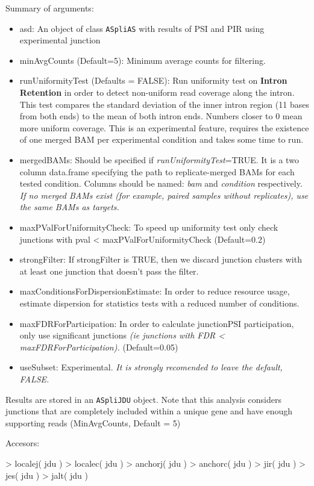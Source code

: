 \documentclass{article}
\begin{document}
Summary of arguments:
\begin{itemize}
\item asd: An object of class \texttt{ASpliAS} with results of PSI and PIR using experimental junction
\item minAvgCounts (Default=5): Minimum average counts for filtering. 
\item runUniformityTest  (Defaults =   FALSE): Run uniformity test on \textbf{Intron Retention} in order to detect non-uniform read coverage along the intron. This test compares the standard deviation of the inner intron region (11 bases from both ends) to the mean of both intron ends. Numbers closer to 0 mean more uniform coverage. This is an experimental feature, requires the existence of one merged BAM per experimental condition and takes some time to run. 
\item mergedBAMs: Should be specified if {\em runUniformityTest}=TRUE. It is a two column data.frame specifying the path to replicate-merged BAMs for each tested condition.  Columns should be named: {\em bam} and {\em condition} respectively.\textit{ If no merged BAMs exist (for example, paired samples without replicates), use the same BAMs as targets.}
\item maxPValForUniformityCheck: To speed up uniformity test only check junctions with pval < maxPValForUniformityCheck (Default=0.2)
\item strongFilter: If strongFilter is TRUE, then we discard junction clusters with at least one junction that doesn't pass the filter.
\item  maxConditionsForDispersionEstimate: In order to reduce resource usage, estimate dispersion for statistics tests with a reduced number of conditions.
\item maxFDRForParticipation: In order to calculate junctionPSI participation, only use significant junctions \textit {(ie junctions with FDR < maxFDRForParticipation).} (Default=0.05)
\item useSubset: Experimental. \textit{It is strongly recomended to leave the default, FALSE.}
\end{itemize}

Results are stored in an \texttt{ASpliJDU} object. Note that this analysis considers junctions that are completely included within a unique gene and have enough supporting reads (MinAvgCounts, Default = 5)

Accesors:

\begin{Schunk}
\begin{Sinput}
>  localej( jdu )
>  localec( jdu )
>  anchorj( jdu )
>  anchorc( jdu )
>  jir( jdu )
>  jes( jdu )
>  jalt( jdu )
\end{Sinput}
\end{Schunk}
\end{document}
